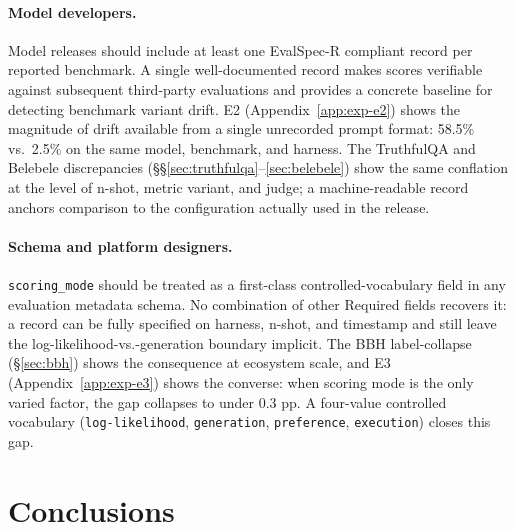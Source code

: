 \documentclass[11pt]{article}
\begin{document}
\paragraph{Model developers.}
Model releases should include at least one EvalSpec-R compliant record per
reported benchmark. A single well-documented record makes scores verifiable
against subsequent third-party evaluations and provides a concrete baseline
for detecting benchmark variant drift. E2 (Appendix~\ref{app:exp-e2})
shows the magnitude of drift available from a single unrecorded prompt
format: 58.5\% vs.\ 2.5\% on the same model, benchmark, and harness. The
TruthfulQA and Belebele discrepancies
(\S\S\ref{sec:truthfulqa}--\ref{sec:belebele}) show the same conflation at
the level of n-shot, metric variant, and judge; a machine-readable record
anchors comparison to the configuration actually used in the release.

\paragraph{Schema and platform designers.}
\texttt{scoring\_mode} should be treated as a first-class
controlled-vocabulary field in any evaluation metadata schema. No
combination of other Required fields recovers it: a record can be fully
specified on harness, n-shot, and timestamp and still leave the
log-likelihood-vs.-generation boundary implicit. The BBH label-collapse
(\S\ref{sec:bbh}) shows the consequence at ecosystem scale, and E3
(Appendix~\ref{app:exp-e3}) shows the converse: when scoring mode is the
only varied factor, the gap collapses to under 0.3 pp. A four-value
controlled vocabulary (\texttt{log-likelihood}, \texttt{generation},
\texttt{preference}, \texttt{execution}) closes this gap.



\section{Conclusions}

%
\end{document}
